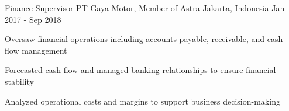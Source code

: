 \begin{cventries}
  \cventry
    {Finance Supervisor} %
    {PT Gaya Motor, Member of Astra} %
    {Jakarta, Indonesia} %
    {Jan 2017 - Sep 2018} %
    {
      \begin{cvitems} %
        \item {Oversaw financial operations including accounts payable, receivable, and cash flow management}
        \item {Forecasted cash flow and managed banking relationships to ensure financial stability}
        \item {Analyzed operational costs and margins to support business decision-making}
      \end{cvitems}
    }




\end{cventries}
